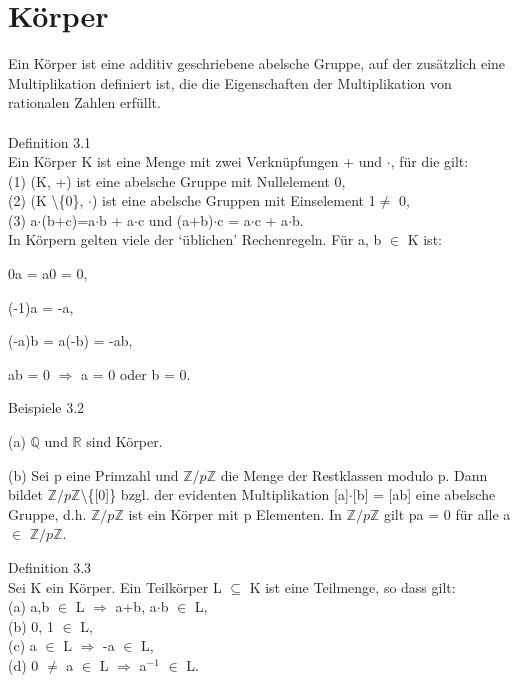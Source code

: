 \documentclass[fontsize=10pt]{scrartcl}
\begin{document}
\section{Körper}
Ein Körper ist eine additiv geschriebene abelsche Gruppe, auf der zusätzlich eine Multiplikation definiert ist, die die Eigenschaften der Multiplikation von rationalen Zahlen erfüllt. \\
\\
Definition 3.1\\
Ein Körper K ist eine Menge mit zwei Verknüpfungen + und $\cdot$, für die gilt: \\
(1) (K, +) ist eine abelsche Gruppe mit Nullelement 0,\\ 
(2) (K \textbackslash \{0\}, $\cdot$) ist eine abelsche Gruppen mit Einselement 1$\neq$ 0,\\
(3) a$\cdot$(b+c)=a$\cdot$b + a$\cdot$c und (a+b)$\cdot$c = a$\cdot$c + a$\cdot$b.\\
In Körpern gelten viele der ‘üblichen’ Rechenregeln. Für a, b $\in$ K ist:
\begin{compactitem} 
\item 0a = a0 = 0, 
\item (-1)a = -a, 
\item (-a)b = a(-b) = -ab, 
\item ab = 0 $\Rightarrow$ a = 0 oder b = 0. \\
\end{compactitem}
Beispiele 3.2
\begin{compactenum}
\item[(a)] $\mathbb{Q}$ und $\mathbb{R}$ sind Körper.
\item[(b)] Sei p eine Primzahl und $\mathbb{Z}/p\mathbb{Z}$ die Menge der Restklassen modulo p. Dann bildet $\mathbb{Z}/p\mathbb{Z}$\textbackslash\{[0]\} bzgl. der evidenten Multiplikation [a]$\cdot$[b] = [ab] eine abelsche Gruppe, d.h. $\mathbb{Z}/p\mathbb{Z}$ ist ein Körper mit p Elementen. In $\mathbb{Z}/p\mathbb{Z}$ gilt pa = 0 für alle a $\in$ $\mathbb{Z}/p\mathbb{Z}$.\\
\end{compactenum}
Definition 3.3\\
Sei K ein Körper. Ein Teilkörper L $\subseteq$ K ist eine Teilmenge, so dass gilt:\\
(a) a,b $\in$ L $\Rightarrow$ a+b, a$\cdot$b $\in$ L, \\
(b) 0, 1 $\in$ L,\\
(c) a $\in$ L $\Rightarrow$ -a $\in$ L,\\ 
(d) 0 $\neq$ a $\in$ L $\Rightarrow$ a$^{-1}$ $\in$ L.\\
\end{document}
